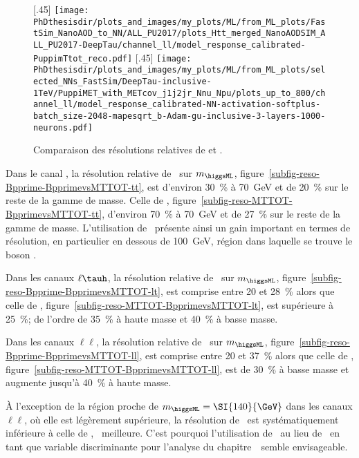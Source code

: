 \begin{figure}[p]
[.45\textwidth]
{\texttt{[image: \\PhDthesisdir/plots\_and\_images/my\_plots/ML/from\_ML\_plots/FastSim\_NanoAOD\_to\_NN/ALL\_PU2017/plots\_Htt\_merged\_NanoAODSIM\_ALL\_PU2017-DeepTau/channel\_ll/model\_response\_calibrated-PuppimTtot\_reco.pdf]}\vspace{-.5\baselineskip}}
\hfill
{}[.45\textwidth]
{\texttt{[image: \\PhDthesisdir/plots\_and\_images/my\_plots/ML/from\_ML\_plots/selected\_NNs\_FastSim/DeepTau-inclusive-1TeV/PuppiMET\_with\_METcov\_j1j2jr\_Nnu\_Npu/plots\_up\_to\_800/channel\_ll/model\_response\_calibrated-NN-activation-softplus-batch\_size-2048-mapesqrt\_b-Adam-gu-inclusive-3-layers-1000-neurons.pdf]}\vspace{-.5\baselineskip}}

\caption{Comparaison des résolutions relatives de \mml et \mTtot.}
\label{fig-BpprimevsMTTOT-reso}
\end{figure}
\par
Dans le canal \tauh\tauh,
la résolution relative de \mml\ sur $m_{\higgsML}$,
figure~\ref{subfig-reso-Bpprime-BpprimevsMTTOT-tt},
est
d'environ \SI{30}{\%} à \SI{70}{\GeV}
et de \SI{20}{\%} sur le reste de la gamme de masse.
Celle de \mTtot,
figure~\ref{subfig-reso-MTTOT-BpprimevsMTTOT-tt},
d'environ \SI{70}{\%} à \SI{70}{\GeV}
et de \SI{27}{\%} sur le reste de la gamme de masse.
L'utilisation de \mml\ présente ainsi un gain important en termes de résolution,
en particulier en dessous de \SI{100}{\GeV}, région dans laquelle se trouve le boson \Zboson.
\par
Dans les canaux $\ell\tauh$,
la résolution relative de \mml\ sur $m_{\higgsML}$,
figure~\ref{subfig-reso-Bpprime-BpprimevsMTTOT-lt},
est
comprise entre \num{20} et \SI{28}{\%}
alors que
celle de \mTtot,
figure~\ref{subfig-reso-MTTOT-BpprimevsMTTOT-lt},
est supérieure à \SI{25}{\%};
de l'ordre de \SI{35}{\%} à haute masse et
\SI{40}{\%} à basse masse.
\par
Dans les canaux $\ell\ell$,
la résolution relative de \mml\ sur $m_{\higgsML}$,
figure~\ref{subfig-reso-Bpprime-BpprimevsMTTOT-ll},
est
comprise entre \num{20} et \SI{37}{\%}
alors que
celle de \mTtot,
figure~\ref{subfig-reso-MTTOT-BpprimevsMTTOT-ll},
est de \SI{30}{\%} à basse masse et augmente
jusqu'à \SI{40}{\%} à haute masse.
\par
À l'exception de la région proche de $m_{\higgsML}=\SI{140}{\GeV}$ dans les canaux $\ell\ell$,
où elle est légèrement supérieure,
la résolution de \mml\ est systématiquement inférieure à celle de \mTtot, \ie\ meilleure.
C'est pourquoi l'utilisation de \mml\ au lieu de \mTtot\ en tant que variable discriminante pour l'analyse du chapitre~\ semble envisageable.
